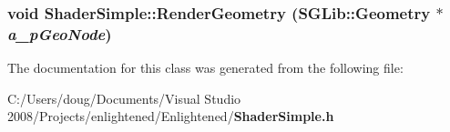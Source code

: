 \subsubsection[{RenderGeometry}]{\setlength{\rightskip}{0pt plus 5cm}void ShaderSimple::RenderGeometry (SGLib::Geometry $\ast$ {\em a\_\-pGeoNode})\hspace{0.3cm}{\ttfamily  [inline]}}\label{class_shader_simple_a33f530c83a2614259c86aef8533c7450}


The documentation for this class was generated from the following file:\begin{DoxyCompactItemize}
\item 
C:/Users/doug/Documents/Visual Studio 2008/Projects/enlightened/Enlightened/{\bf ShaderSimple.h}\end{DoxyCompactItemize}
